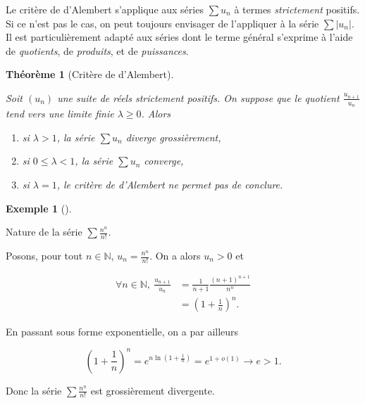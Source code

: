 \documentclass[
  french,
  letterpaper,
  DIV=11,
  numbers=noendperiod]{scrreprt}
\providecommand{\tightlist}{%
  \setlength{\itemsep}{0pt}\setlength{\parskip}{0pt}}
\theoremstyle{plain}
\theoremstyle{definition}
\theoremstyle{plain}
\theoremstyle{plain}
\newtheorem{theorem}{Théorème}[chapter]
\theoremstyle{definition}
\theoremstyle{definition}
\newtheorem{example}{Exemple}[chapter]
\theoremstyle{plain}
\theoremstyle{remark}
\begin{document}
Le critère de d'Alembert s'applique aux séries \(\sum u_{n}\) à termes
\emph{strictement} positifs. Si ce n'est pas le cas, on peut toujours
envisager de l'appliquer à la série \(\sum |u_{n}|\). Il est
particulièrement adapté aux séries dont le terme général s'exprime à
l'aide de \emph{quotients}, de \emph{produits}, et de \emph{puissances}.

\begin{theorem}[Critère de
d'Alembert]\protect\hypertarget{thm-critere-alembert}{}\label{thm-critere-alembert}

Soit \((u_{n})\) une suite de réels \emph{strictement positifs}. On
suppose que le quotient \(\frac{u_{n+1}}{u_{n}}\) tend vers une limite
finie \(\lambda \geqslant
0\). Alors

\begin{enumerate}
\def\labelenumi{\arabic{enumi}.}
\tightlist
\item
  si \(\lambda > 1\), la série \(\sum u_{n}\) diverge grossièrement,
\item
  si \(0 \leqslant \lambda < 1\), la série \(\sum u_{n}\) converge,
\item
  si \(\lambda = 1\), le critère de d'Alembert ne permet pas de
  conclure.
\end{enumerate}

\end{theorem}

\begin{example}[]\protect\hypertarget{exm-factoriel}{}\label{exm-factoriel}

Nature de la série \(\sum \frac{n^{n}}{n!}\).

Posons, pour tout \(n \in \mathbb{N}\), \(u_{n}=\frac{n^{n}}{n!}\). On a
alors \(u_{n}>0\) et

\[
\begin{aligned}
    \forall n \in \mathbb{N},\ \frac{u_{n+1}}{u_{n}} & = \frac{1}{n+1}\frac{(n+1)^{n+1}}{n^{n}}\\
                                                     & = \left(1+\frac{1}{n}\right)^{n}.
\end{aligned}
\]

En passant sous forme exponentielle, on a par ailleurs

\[
    \left(1+\frac{1}{n}\right)^{n}=e^{n \ln
    \left(1+\frac{1}{n}\right)}=e^{1+o(1)} \to e>1.
\]

Donc la série \(\sum \frac{n^{n}}{n!}\) est grossièrement divergente.

\end{example}
\end{document}
